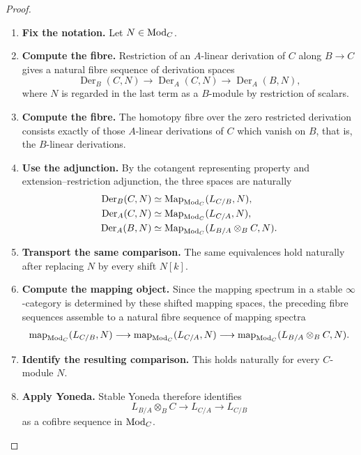 \begin{proof}
\leavevmode
\begin{enumerate}[label=\textup{(\arabic*)}]
    \item \textbf{Fix the notation.}
    Let \(N\in\operatorname{Mod}_C\).

    \item \textbf{Compute the fibre.}
    Restriction of an \(A\)-linear derivation of \(C\) along \(B\to C\) gives a
    natural fibre sequence of derivation spaces
    \[
        \operatorname{Der}_B(C,N)
        \longrightarrow
        \operatorname{Der}_A(C,N)
        \longrightarrow
        \operatorname{Der}_A(B,N),
    \]
    where \(N\) is regarded in the last term as a \(B\)-module by restriction of
    scalars.

    \item \textbf{Compute the fibre.}
    The homotopy fibre over the zero restricted derivation consists exactly of those
    \(A\)-linear derivations of \(C\) which vanish on \(B\), that is, the
    \(B\)-linear derivations.

    \item \textbf{Use the adjunction.}
    By the cotangent representing property and extension--restriction adjunction, the three
    spaces are naturally
    \[
    \begin{aligned}
        \operatorname{Der}_B(C,N)
        &\simeq
        \operatorname{Map}_{\operatorname{Mod}_C}(L_{C/B},N),
        \\
        \operatorname{Der}_A(C,N)
        &\simeq
        \operatorname{Map}_{\operatorname{Mod}_C}(L_{C/A},N),
        \\
        \operatorname{Der}_A(B,N)
        &\simeq
        \operatorname{Map}_{\operatorname{Mod}_C}(L_{B/A}\otimes_BC,N).
    \end{aligned}
    \]

    \item \textbf{Transport the same comparison.}
    The same equivalences hold naturally after replacing \(N\) by every shift \(N[k]\).

    \item \textbf{Compute the mapping object.}
    Since the mapping spectrum in a stable \(\infty\)-category is determined by these shifted
    mapping spaces, the preceding fibre sequences assemble to a natural fibre sequence of
    mapping spectra
    \[
    \begin{aligned}
        \operatorname{map}_{\operatorname{Mod}_C}(L_{C/B},N)
        \longrightarrow
        \operatorname{map}_{\operatorname{Mod}_C}(L_{C/A},N)
        \longrightarrow
        \operatorname{map}_{\operatorname{Mod}_C}(L_{B/A}\otimes_BC,N).
    \end{aligned}
    \]

    \item \textbf{Identify the resulting comparison.}
    This holds naturally for every \(C\)-module \(N\).

    \item \textbf{Apply Yoneda.}
    Stable Yoneda therefore identifies
    \[
        L_{B/A}\otimes_BC
        \longrightarrow
        L_{C/A}
        \longrightarrow
        L_{C/B}
    \]
    as a cofibre sequence in \(\operatorname{Mod}_C\).
\end{enumerate}
\end{proof}


